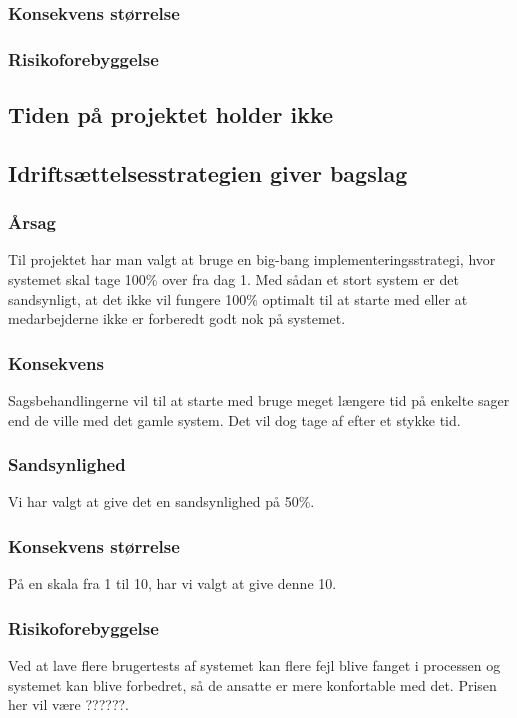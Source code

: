 \documentclass[10pt,a4paper,danish]{article}
\begin{document}
\subsubsection{Konsekvens størrelse}

\subsubsection{Risikoforebyggelse}




\subsection{Tiden på projektet holder ikke}





\subsection{Idriftsættelsesstrategien giver bagslag}
\subsubsection{Årsag}
Til projektet har man valgt at bruge en big-bang implementeringsstrategi, hvor systemet skal tage 100\% over fra dag 1.
Med sådan et stort system er det sandsynligt, at det ikke vil fungere 100\% optimalt til at starte med eller at medarbejderne ikke er forberedt godt nok på systemet.
\subsubsection{Konsekvens}
Sagsbehandlingerne vil til at starte med bruge meget længere tid på enkelte sager end de ville med det gamle system. Det vil dog tage af efter et stykke tid.
\subsubsection{Sandsynlighed}
Vi har valgt at give det en sandsynlighed på 50\%.
\subsubsection{Konsekvens størrelse}
På en skala fra 1 til 10, har vi valgt at give denne 10.
\subsubsection{Risikoforebyggelse}
Ved at lave flere brugertests af systemet kan flere fejl blive fanget i processen og systemet kan blive forbedret, så de ansatte er mere konfortable med det. Prisen her vil være ??????.
\end{document}
